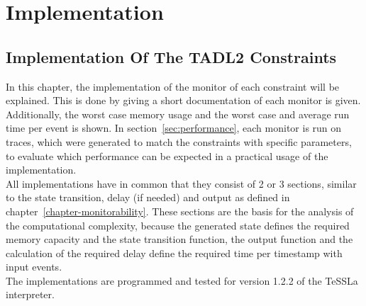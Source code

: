 
\chapter{Implementation}
\label{chapter-implementation}
	\section{Implementation Of The TADL2 Constraints}
	In this chapter, the implementation of the monitor of each constraint will be explained. This is done by giving a short documentation of each monitor is given. Additionally, the worst case memory usage and the worst case and average run time per event is shown. In section~\ref{sec:performance}, each monitor is run on traces, which were generated to match the constraints with specific parameters, to evaluate which performance can be expected in a practical usage of the implementation.\\
	All implementations have in common that they consist of 2 or 3 sections, similar to the state transition, delay (if needed) and output as defined in chapter~\ref{chapter-monitorability}. These sections are the basis for the analysis of the computational complexity, because the generated state defines the required memory capacity and the state transition function, the output function and the calculation of the required delay define the required time per timestamp with input events.\\
	The implementations are programmed and tested for version 1.2.2 of the TeSSLa interpreter.
